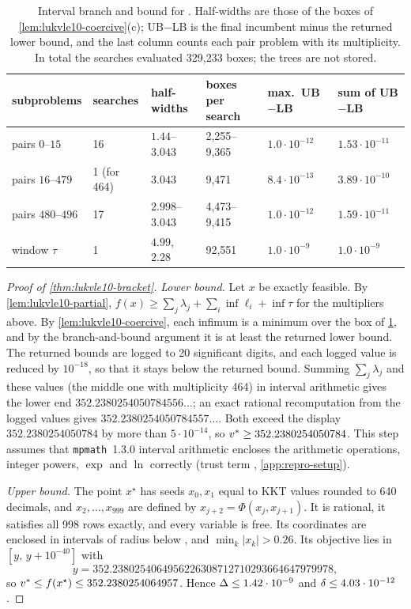 \begin{table}[ht]
\centering
\small
\caption{Interval branch and bound for .
Half-widths are those of the boxes of \cref{lem:lukvle10-coercive}(c); UB$-$LB is the final incumbent minus the returned lower bound, and the last column counts each pair problem with its multiplicity.
In total the searches evaluated 329{,}233 boxes; the trees are not stored.}
\label{tab:lukvle10-bnb}
\begin{tabular}{@{}llllll@{}}
\toprule
subproblems & searches & half-widths & boxes per search & max.\ UB$-$LB & sum of UB$-$LB\\
\midrule
pairs $0$--$15$ & 16 & $1.44$--$3.043$ & 2{,}255--9{,}365 & $1.0\cdot10^{-12}$ & $1.53\cdot10^{-11}$\\
pairs $16$--$479$ & 1 (for 464) & $3.043$ & 9{,}471 & $8.4\cdot10^{-13}$ & $3.89\cdot10^{-10}$\\
pairs $480$--$496$ & 17 & $2.998$--$3.043$ & 4{,}473--9{,}415 & $1.0\cdot10^{-12}$ & $1.59\cdot10^{-11}$\\
window $\tau$ & 1 & $4.99$, $2.28$ & 92{,}551 & $1.0\cdot10^{-9}$ & $1.0\cdot10^{-9}$\\
\bottomrule
\end{tabular}
\end{table}

\begin{proof}[Proof of \cref{thm:lukvle10-bracket}]
\emph{Lower bound.}
Let $x$ be exactly feasible.
By \cref{lem:lukvle10-partial}, $f(x)\ge\sum_j\lambda_j+\sum_i\inf\ell_i+\inf\tau$ for the multipliers above.
By \cref{lem:lukvle10-coercive}, each infimum is a minimum over the box of \cref{tab:lukvle10-bnb}, and by the branch-and-bound argument it is at least the returned lower bound.
The returned bounds are logged to 20 significant digits, and each logged value is reduced by $10^{-18}$, so that it stays below the returned bound.
Summing $\sum_j\lambda_j$ and these values (the middle one with multiplicity 464) in interval arithmetic gives the lower end $352.2380254050784556\ldots$; an exact rational recomputation from the logged values gives $352.2380254050784557\ldots$.
Both exceed the display $352.2380254050784$ by more than $5\cdot10^{-14}$, so $v^{*}\ge352.2380254050784$.
This step assumes that \texttt{mpmath}~1.3.0 interval arithmetic encloses the arithmetic operations, integer powers, $\exp$ and $\ln$ correctly (trust term , \cref{app:repro-setup}).

\emph{Upper bound.}
The point $x^\star$ has seeds $x_0,x_1$ equal to KKT values rounded to 640 decimals, and $x_2,\dots,x_{999}$ are defined by $x_{j+2}=\Phi(x_j,x_{j+1})$.
It is rational, it satisfies all 998 rows exactly, and every variable is free.
Its coordinates are enclosed in intervals of radius below , and $\min_k|x_k|>0.26$.
Its objective lies in $[y,\,y+10^{-40}]$ with
\[
y=352.2380254064956226308712710293664647979978,
\]
so $v^{*}\le f(x^\star)\le352.2380254064957$.
Hence $\Delta\le1.42\cdot 10^{-9}$ and $\delta\le4.03\cdot 10^{-12}$.
\end{proof}

